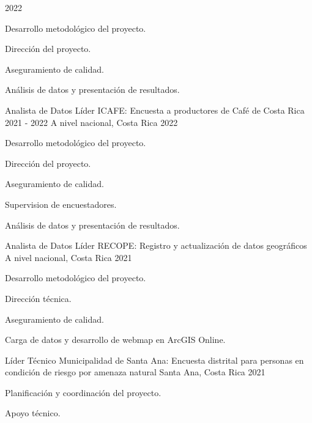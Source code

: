 \begin{cventries}
{2022} %
{
  \begin{cvitems} %
    \item Desarrollo metodológico del proyecto.
    \item Dirección del proyecto.
    \item Aseguramiento de calidad.
    \item Análisis de datos y presentación de resultados.
  \end{cvitems}
}
\cventry
{Analista de Datos Líder} %
{ICAFE: Encuesta a productores de Café de Costa Rica 2021 - 2022} %
{A nivel nacional, Costa Rica} %
{2022} %
{
  \begin{cvitems} %
    \item Desarrollo metodológico del proyecto.
    \item Dirección del proyecto.
    \item Aseguramiento de calidad.
    \item Supervision de encuestadores.
    \item Análisis de datos y presentación de resultados.
  \end{cvitems}
}
\cventry
{Analista de Datos Líder} %
{RECOPE: Registro y actualización de datos geográficos} %
{A nivel nacional, Costa Rica} %
{2021} %
{
  \begin{cvitems} %
    \item Desarrollo metodológico del proyecto.
    \item Dirección técnica.
    \item Aseguramiento de calidad.
    \item Carga de datos y desarrollo de webmap en ArcGIS Online.
  \end{cvitems}
}
\cventry
{Líder Técnico} %
{Municipalidad de Santa Ana: Encuesta distrital para personas en condición de riesgo por
amenaza natural} %
{Santa Ana, Costa Rica} %
{2021} %
{
  \begin{cvitems} %
    \item Planificación y coordinación del proyecto.
    \item Apoyo técnico.

\end{cvitems}}
\end{cventries}
